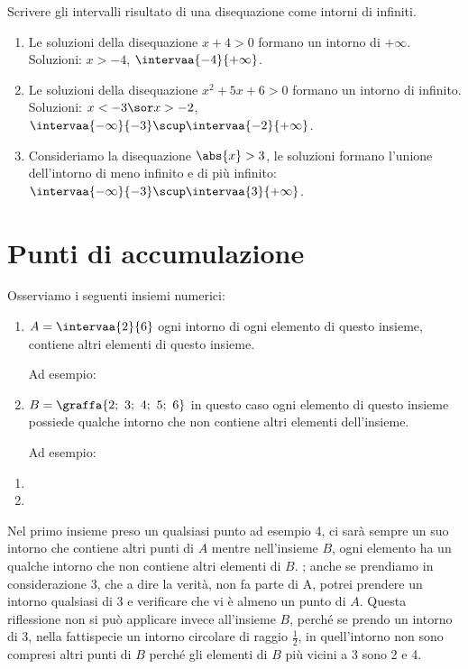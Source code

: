 \begin{esempio} Scrivere gli intervalli risultato di una disequazione come 
intorni di infiniti.
\begin{enumerate}[label=\alph*)]
\item Le soluzioni della disequazione \(x+4 > 0\) formano un intorno 
di \(+\infty\).  
Soluzioni: \(x > -4\), \(\intervaa{-4}{+\infty}\).
\item Le soluzioni della disequazione \(x^2+5x+6 > 0\) formano un 
intorno di infinito. 
Soluzioni: \(x < -3 \sor x > -2\), 
\(\intervaa{-\infty}{-3} \scup \intervaa{-2}{+\infty}\).
\item Consideriamo la disequazione \(\abs{x}>3\), 
le soluzioni formano l'unione dell'intorno di meno infinito e di più infinito:
\(\intervaa{-\infty}{-3} \scup \intervaa{3}{+\infty}\).
\end{enumerate} 
\end{esempio}

\section{Punti di accumulazione}
\label{sec:topologiapuntiaccumulazione}

Osserviamo i seguenti insiemi numerici:
\begin{enumerate}
\item \(A = \intervaa{2}{6}\) \quad 
ogni intorno di ogni elemento di questo insieme, contiene altri elementi di 
questo insieme.

Ad esempio:

\item \(B=\graffa{2;~3;~4;~5;~6}\) \quad 
in questo caso ogni elemento di questo insieme possiede qualche intorno che non 
contiene altri elementi dell'insieme.

Ad esempio:
\end{enumerate}

\begin{esempio}
\begin{enumerate}
 \item 
 \item 
\end{enumerate}
\end{esempio}

Nel primo insieme preso un qualsiasi punto ad esempio 4, ci sarà sempre un 
suo intorno che contiene altri punti di \(A\) 
mentre nell'insieme \(B\), ogni elemento ha un qualche intorno che non contiene 
altri elementi di \(B\).
; anche se prendiamo in 
considerazione 3, che a dire la verità, non fa parte di A, potrei prendere un 
intorno qualsiasi di 3 e verificare che vi è almeno un punto di \(A\). Questa 
riflessione non si può applicare invece all'insieme \(B\), perché se prendo 
un intorno di 3, nella fattispecie un intorno circolare di raggio 
\(\frac{1}{2}\), 
in quell'intorno non sono compresi altri punti di \(B\) perché gli elementi 
di \(B\) più vicini a 3 sono 2 e 4.

